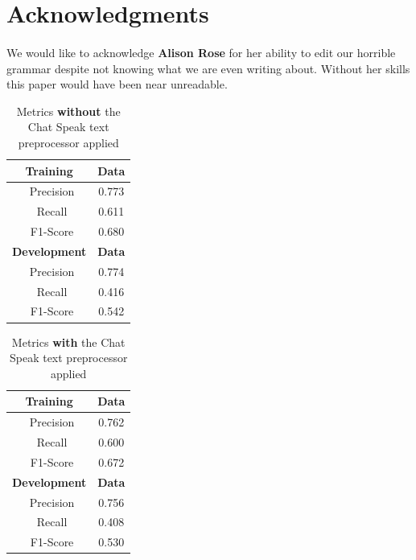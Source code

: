 \documentclass[11pt,letterpaper]{article}
\begin{document}


\section*{Acknowledgments}
\paragraph{}
We would like to acknowledge {\bf Alison Rose} for her ability to edit our horrible grammar despite not knowing what we are even writing about. Without her skills this paper would have been near unreadable.



\begin{table}[p]
\begin{center}
\begin{tabularx}{111pt}{|c|c|}
\hline
\bf Training & \bf Data \\ 
\hline
\ Precision & 0.773 \\
\ Recall & 0.611 \\
\ F1-Score & 0.680 \\
\hline
\bf Development & \bf Data \\ 
\hline
\ Precision & 0.774 \\
\ Recall & 0.416 \\
\ F1-Score & 0.542 \\
\hline
\end{tabularx}
\end{center}
\caption{\label{chatspeak-without-table} Metrics {\bf without} the Chat Speak text preprocessor applied }
\end{table}

\begin{table}[p]
\begin{center}
\begin{tabularx}{111pt}{|c|c|}
\hline
\bf Training & \bf Data \\ 
\hline
\ Precision & 0.762 \\
\ Recall & 0.600 \\
\ F1-Score & 0.672 \\
\hline
\bf Development & \bf Data \\ 
\hline
\ Precision & 0.756 \\
\ Recall & 0.408 \\
\ F1-Score & 0.530 \\
\hline
\end{tabularx}
\end{center}
\caption{\label{chatspeak-with-table} Metrics {\bf with} the Chat Speak text preprocessor applied }
\end{table}
\end{document}
